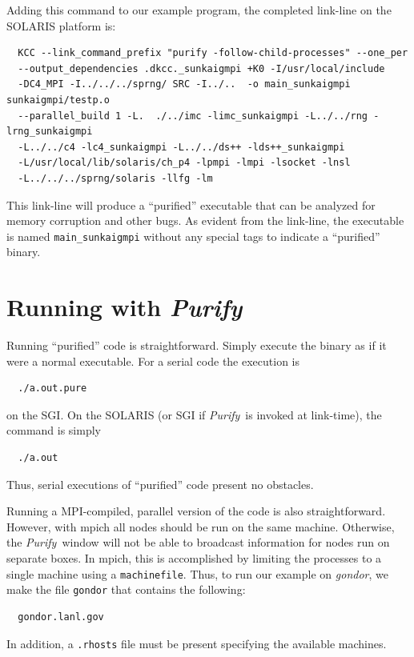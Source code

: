 \documentclass[11pt]{../tex/nmemo}
\newcommand{\purify}{\textsl{Purify}}
\newcommand{\pkg}[1]{\textsf{#1}}
\newcommand{\dir}[1]{\textsl{#1}}
\begin{document}
Adding this command to our example program, the completed link-line
on the SOLARIS platform is:
\begin{verbatim}
  KCC --link_command_prefix "purify -follow-child-processes" --one_per 
  --output_dependencies .dkcc._sunkaigmpi +K0 -I/usr/local/include 
  -DC4_MPI -I../../../sprng/ SRC -I../..  -o main_sunkaigmpi sunkaigmpi/testp.o
  --parallel_build 1 -L.  ./../imc -limc_sunkaigmpi -L../../rng -lrng_sunkaigmpi
  -L../../c4 -lc4_sunkaigmpi -L../../ds++ -lds++_sunkaigmpi
  -L/usr/local/lib/solaris/ch_p4 -lpmpi -lmpi -lsocket -lnsl
  -L../../../sprng/solaris -llfg -lm
\end{verbatim}
This link-line will produce a ``purified'' executable that can be
analyzed for memory corruption and other bugs.  As evident from the
link-line, the executable is named {\tt main\_sunkaigmpi} without
any special tags to indicate a ``purified'' binary.


\section*{Running with \purify}

Running ``purified'' code is straightforward.  Simply execute the
binary as if it were a normal executable.  For a serial code the
execution is
\begin{verbatim}
  ./a.out.pure
\end{verbatim}
on the SGI.  On the SOLARIS (or SGI if \purify\ is invoked at
link-time), the command is simply
\begin{verbatim}
  ./a.out
\end{verbatim}
Thus, serial executions of ``purified'' code present no obstacles.

Running a MPI-compiled, parallel version of the code is also
straightforward.  However, with \pkg{mpich} all nodes should be run on
the same machine. Otherwise, the \purify\ window will not be able to
broadcast information for nodes run on separate boxes.  In
\pkg{mpich}, this is accomplished by limiting the processes to a single
machine using a {\tt machinefile}.  Thus, to run our example on
\dir{gondor}, we make the file {\tt gondor} that contains the
following:
\begin{verbatim}
  gondor.lanl.gov
\end{verbatim}
In addition, a {\tt .rhosts} file must be present specifying the
available machines.
\end{document}
